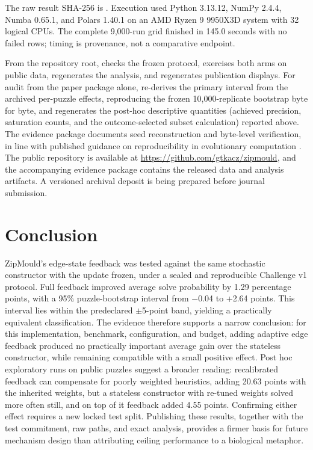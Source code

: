 \documentclass[pdflatex,sn-basic,iicol]{sn-jnl}
\begin{document}
The raw result SHA-256 is . Execution used Python 3.13.12, NumPy 2.4.4, Numba 0.65.1, and Polars 1.40.1 on an AMD Ryzen 9 9950X3D system with 32 logical CPUs. The complete 9,000-run grid finished in 145.0 seconds with no failed rows; timing is provenance, not a comparative endpoint.

From the repository root,  checks the frozen protocol,  exercises both arms on public data,  regenerates the analysis, and  regenerates publication displays. For audit from the paper package alone,  re-derives the primary interval from the archived per-puzzle effects, reproducing the frozen 10,000-replicate bootstrap byte for byte, and regenerates the post-hoc descriptive quantities (achieved precision, saturation counts, and the outcome-selected subset calculation) reported above. The evidence package documents seed reconstruction and byte-level verification, in line with published guidance on reproducibility in evolutionary computation \citep{lopezibanez2021reproducibility}. The public repository is available at \url{https://github.com/gtkacz/zipmould}, and the accompanying evidence package contains the released data and analysis artifacts. A versioned archival deposit is being prepared before journal submission.

\section{Conclusion}

ZipMould's edge-state feedback was tested against the same stochastic constructor with the update frozen, under a sealed and reproducible Challenge v1 protocol. Full feedback improved average solve probability by 1.29 percentage points, with a 95\% puzzle-bootstrap interval from \(-\)0.04 to +2.64 points. This interval lies within the predeclared \(\pm\)5-point band, yielding a practically equivalent classification. The evidence therefore supports a narrow conclusion: for this implementation, benchmark, configuration, and budget, adding adaptive edge feedback produced no practically important average gain over the stateless constructor, while remaining compatible with a small positive effect. Post hoc exploratory runs on public puzzles suggest a broader reading: recalibrated feedback can compensate for poorly weighted heuristics, adding 20.63 points with the inherited weights, but a stateless constructor with re-tuned weights solved more often still, and on top of it feedback added 4.55 points. Confirming either effect requires a new locked test split. Publishing these results, together with the test commitment, raw paths, and exact analysis, provides a firmer basis for future mechanism design than attributing ceiling performance to a biological metaphor.
\end{document}
